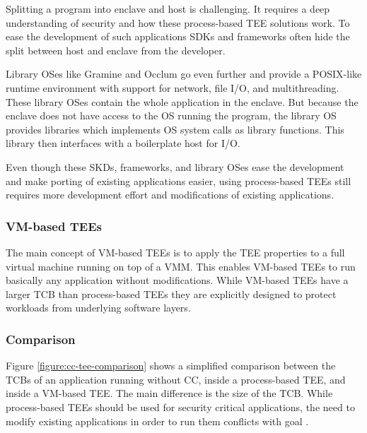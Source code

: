 
Splitting a program into enclave and host is challenging. It requires a deep
understanding of security and how these process-based TEE solutions work. To
ease the development of such applications SDKs and frameworks often hide the
split between host and enclave from the developer\cite{schuster2022}.

Library OSes like Gramine and Occlum go even further and provide a POSIX-like
runtime environment with support for network, file I/O, and multithreading.
These library OSes contain the whole application in the enclave. But because the
enclave does not have access to the OS running the program, the library OS
provides libraries which implements OS system calls as library functions. This
library then interfaces with a boilerplate host for I/O\cite{tsai2014}.

Even though these SKDs, frameworks, and library OSes ease the development and
make porting of existing applications easier, using process-based TEEs still
requires more development effort and modifications of existing applications.


\subsubsection{VM-based TEEs}

The main concept of VM-based TEEs is to apply the TEE properties to a full
virtual machine running on top of a VMM. This enables VM-based TEEs to run
basically any application without modifications. While VM-based TEEs have a
larger TCB than process-based TEEs they are explicitly designed to protect
workloads from underlying software layers.


\subsubsection{Comparison}

Figure \ref{figure:cc-tee-comparison} shows a simplified comparison between the
TCBs of an application running without CC, inside a process-based TEE, and
inside a VM-based TEE. The main difference is the size of the TCB. While
process-based TEEs should be used for security critical applications, the
need to modify existing applications in order to run them conflicts with goal
.

